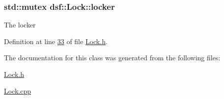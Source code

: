 \subsubsection[{locker}]{\setlength{\rightskip}{0pt plus 5cm}std\+::mutex dsf\+::\+Lock\+::locker\hspace{0.3cm}{\ttfamily [protected]}}\label{classdsf_1_1_lock_a605f27e33e37dc8b3b920a3272461c44}
The locker 

Definition at line \hyperlink{_lock_8h_source_l00033}{33} of file \hyperlink{_lock_8h_source}{Lock.\+h}.



The documentation for this class was generated from the following files\+:\begin{DoxyCompactItemize}
\item 
\hyperlink{_lock_8h}{Lock.\+h}\item 
\hyperlink{_lock_8cpp}{Lock.\+cpp}\end{DoxyCompactItemize}

